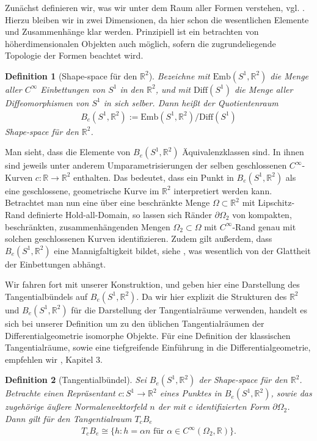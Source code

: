 \documentclass[bibliography=totoc,12pt,a4paper]{scrartcl}
\theoremstyle{exampstyle}
\newtheorem{defi}{Definition}%
\numberwithin{equation}{section}
\begin{document}
Zunächst definieren wir, was wir unter dem Raum aller Formen verstehen, vgl. \cite{bfgs1}. Hierzu bleiben wir in zwei Dimensionen, da hier schon die wesentlichen Elemente und Zusammenhänge klar werden. Prinzipiell ist ein betrachten von höherdimensionalen Objekten auch möglich, sofern die zugrundeliegende Topologie der Formen beachtet wird.

\begin{defi}[Shape-space für den $\mathbb{R}^2$]
Bezeichne mit $\text{Emb}(S^1, \mathbb{R}^2)$ die Menge aller $C^\infty$ Einbettungen von $S^1$ in den $\mathbb{R}^2$, und mit $\text{Diff}(S^1)$ die Menge aller Diffeomorphismen von $S^1$ in sich selber. Dann heißt der Quotientenraum
\begin{align*}
	B_e(S^1,\mathbb{R}^2) := \text{Emb}(S^1, \mathbb{R}^2) / \text{Diff}(S^1)
\end{align*}
\textit{Shape-space} für den $\mathbb{R}^2$.
\end{defi}

Man sieht, dass die Elemente von $B_e(S^1,\mathbb{R}^2)$ Äquivalenzklassen sind. In ihnen sind jeweils unter anderem Umparametrisierungen der selben geschlossenen $C^\infty$-Kurven $c: \mathbb{R} \rightarrow \mathbb{R}^2$ enthalten. Das bedeutet, dass ein Punkt in $B_e(S^1,\mathbb{R}^2)$ als eine geschlossene, geometrische Kurve im $\mathbb{R}^2$ interpretiert werden kann. Betrachtet man nun eine über eine beschränkte Menge $\Omega\subset\mathbb{R}^2$ mit Lipschitz-Rand definierte Hold-all-Domain, so lassen sich Ränder $\partial\Omega_2$ von kompakten, beschränkten, zusammenhängenden Mengen $\Omega_2\subset \Omega$ mit $C^\infty$-Rand genau mit solchen geschlossenen Kurven identifizieren. Zudem gilt außerdem, dass $B_e(S^1,\mathbb{R}^2)$ eine Mannigfaltigkeit bildet, siehe \cite{bfgs1}, was wesentlich von der Glattheit der Einbettungen abhängt.

Wir fahren fort mit unserer Konstruktion, und geben hier eine Darstellung des Tangentialbündels auf $B_e(S^1,\mathbb{R}^2)$. Da wir hier explizit die Strukturen des $\mathbb{R}^2$ und $B_e(S^1,\mathbb{R}^2)$ für die Darstellung der Tangentialräume verwenden, handelt es sich bei unserer Definition um zu den üblichen Tangentialräumen der Differentialgeometrie isomorphe Objekte. Für eine Definition der klassischen Tangentialräume, sowie eine tiefgreifende Einführung in die Differentialgeometrie, empfehlen wir \cite{LeeDGEO}, Kapitel 3.

\begin{defi}[Tangentialbündel]\label{Tangentialvektor}
Sei $B_e(S^1, \mathbb{R}^2)$ der Shape-space für den $\mathbb{R}^2$. Betrachte einen Repräsentant $c: S^1 \rightarrow \mathbb{R}^2$ eines Punktes in $B_e(S^1, \mathbb{R}^2)$, sowie das zugehörige äußere Normalenvektorfeld $n$ der mit $c$ identifizierten Form $\partial\Omega_2$. Dann gilt für den \textit{Tangentialraum} $T_cB_e$
\begin{align*}
	T_cB_e \cong \{h : h = \alpha n \text{ für } \alpha \in C^\infty(\Omega_2,\mathbb{R})\}.
\end{align*}

\end{defi}
\end{document}
